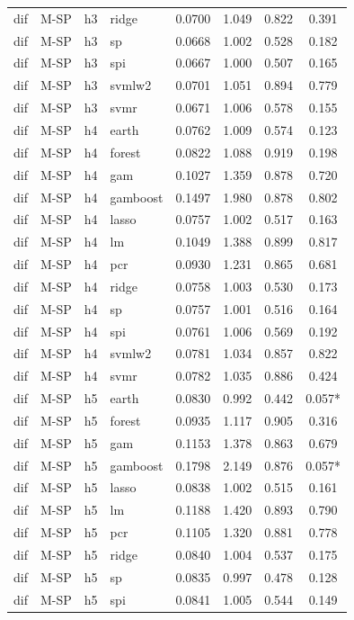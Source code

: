 \begin{ThreePartTable}
\begin{longtable}[t]{llclcccc}
dif & M-SP & h3 & ridge & 0.0700 & 1.049 & 0.822 & 0.391\\
dif & M-SP & h3 & sp & 0.0668 & 1.002 & 0.528 & 0.182\\
dif & M-SP & h3 & spi & 0.0667 & 1.000 & 0.507 & 0.165\\
dif & M-SP & h3 & svmlw2 & 0.0701 & 1.051 & 0.894 & 0.779\\
dif & M-SP & h3 & svmr & 0.0671 & 1.006 & 0.578 & 0.155\\
\addlinespace
dif & M-SP & h4 & earth & 0.0762 & 1.009 & 0.574 & 0.123\\
dif & M-SP & h4 & forest & 0.0822 & 1.088 & 0.919 & 0.198\\
dif & M-SP & h4 & gam & 0.1027 & 1.359 & 0.878 & 0.720\\
dif & M-SP & h4 & gamboost & 0.1497 & 1.980 & 0.878 & 0.802\\
dif & M-SP & h4 & lasso & 0.0757 & 1.002 & 0.517 & 0.163\\
dif & M-SP & h4 & lm & 0.1049 & 1.388 & 0.899 & 0.817\\
dif & M-SP & h4 & pcr & 0.0930 & 1.231 & 0.865 & 0.681\\
dif & M-SP & h4 & ridge & 0.0758 & 1.003 & 0.530 & 0.173\\
dif & M-SP & h4 & sp & 0.0757 & 1.001 & 0.516 & 0.164\\
dif & M-SP & h4 & spi & 0.0761 & 1.006 & 0.569 & 0.192\\
dif & M-SP & h4 & svmlw2 & 0.0781 & 1.034 & 0.857 & 0.822\\
dif & M-SP & h4 & svmr & 0.0782 & 1.035 & 0.886 & 0.424\\
\addlinespace
dif & M-SP & h5 & earth & 0.0830 & 0.992 & 0.442 & 0.057*\\
dif & M-SP & h5 & forest & 0.0935 & 1.117 & 0.905 & 0.316\\
dif & M-SP & h5 & gam & 0.1153 & 1.378 & 0.863 & 0.679\\
dif & M-SP & h5 & gamboost & 0.1798 & 2.149 & 0.876 & 0.057*\\
dif & M-SP & h5 & lasso & 0.0838 & 1.002 & 0.515 & 0.161\\
dif & M-SP & h5 & lm & 0.1188 & 1.420 & 0.893 & 0.790\\
dif & M-SP & h5 & pcr & 0.1105 & 1.320 & 0.881 & 0.778\\
dif & M-SP & h5 & ridge & 0.0840 & 1.004 & 0.537 & 0.175\\
dif & M-SP & h5 & sp & 0.0835 & 0.997 & 0.478 & 0.128\\
dif & M-SP & h5 & spi & 0.0841 & 1.005 & 0.544 & 0.149\\

\end{longtable}
\end{ThreePartTable}
